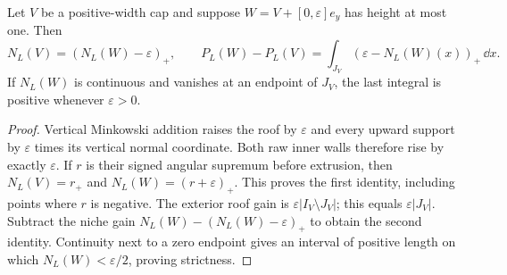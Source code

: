 \begin{lemma}\label{lem:full-extrusion-deficit}
Let $V$ be a positive-width cap and suppose
$W=V+[0,\varepsilon]e_y$ has height at most one. Then
\begin{equation}\label{eq:full-extrusion-deficit}
 N_L(V)=(N_L(W)-\varepsilon)_+,\qquad
 P_L(W)-P_L(V)=\int_{J_V}(\varepsilon-N_L(W)(x))_+\,\dd x.
\end{equation}
If $N_L(W)$ is continuous and vanishes at an endpoint of $J_V$,
the last integral is positive whenever $\varepsilon>0$.
\end{lemma}
\begin{proof}
Vertical Minkowski addition raises the roof by $\varepsilon$
and every upward support by $\varepsilon$ times its vertical
normal coordinate. Both raw inner walls therefore rise by
exactly $\varepsilon$. If $r$ is their signed angular supremum
before extrusion, then $N_L(V)=r_+$ and
$N_L(W)=(r+\varepsilon)_+$. This proves the first identity,
including points where $r$ is negative.
The exterior roof gain is $\varepsilon|I_V\setminus J_V|$;
this equals $\varepsilon|J_V|$. Subtract the niche gain
$N_L(W)-(N_L(W)-\varepsilon)_+$ to obtain the second identity.
Continuity next to a zero endpoint gives an interval of positive
length on which $N_L(W)<\varepsilon/2$, proving strictness.
\end{proof}

